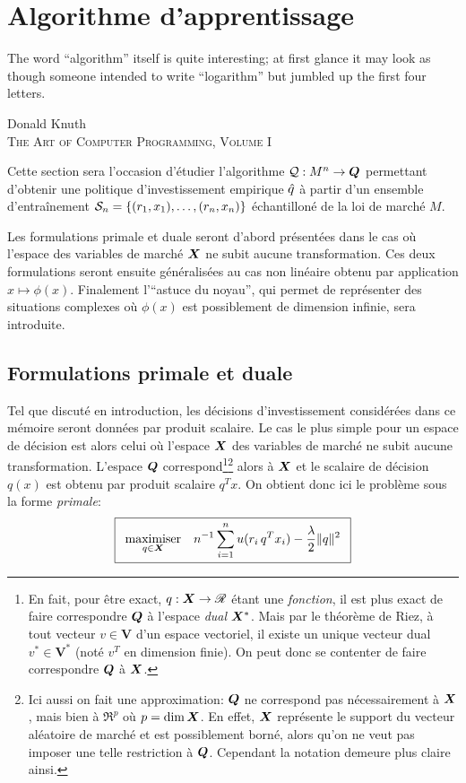 \section{Algorithme d'apprentissage}
\label{sec:kernel}

\epigraph{The word “algorithm” itself is quite interesting; at first glance it may look as
  though someone intended to write “logarithm” but jumbled up the first four
  letters.}{Donald Knuth\\\textsc{The Art of Computer Programming, Volume I}}


Cette section sera l'occasion d'étudier l'algorithme $\alg:M^n \to \Q$ permettant d'obtenir
une politique d'investissement empirique $\qh$ à partir d'un ensemble d'entraînement
$\S_n = \{(r_1,x_1),\ldots,(r_n,x_n)\}$ échantilloné de la loi de marché $M$.

Les formulations primale et duale seront d'abord présentées dans le cas où l'espace des
variables de marché $\X$ ne subit aucune transformation. Ces deux formulations seront
ensuite généralisées au cas non linéaire obtenu par application $x \mapsto \phi(x)$. Finalement
l'``astuce du noyau'', qui permet de représenter des situations complexes où $\phi(x)$ est
possiblement de dimension infinie, sera introduite. 


\subsection{Formulations primale et duale}

Tel que discuté en introduction, les décisions d'investissement considérées dans ce
mémoire seront données par produit scalaire. Le cas le plus simple pour un espace de
décision est alors celui où l'espace $\X$ des variables de marché ne subit aucune
transformation. L'espace $\Q$ correspond\footnote{En fait, pour être exact,
  $q : \X \to \Re$ étant une \textit{fonction}, il est plus exact de faire correspondre
  $\Q$ à l'espace \textit{dual} $\X^*$. Mais par le théorème de Riez, à tout vecteur
  $v \in \bm V$ d'un espace vectoriel, il existe un unique vecteur dual $v^* \in \bm V^*$
  (noté $v^T$ en dimension finie). On peut donc se contenter de faire correspondre $\Q$ à
  $\X$.}\footnote{Ici aussi on fait une approximation: $\Q$ ne correspond pas
  nécessairement à $\X$, mais bien à $\Re^p$ où $p = \dim\X$. En effet, $\X$ représente le
  support du vecteur aléatoire de marché et est possiblement borné, alors qu'on ne veut
  pas imposer une telle restriction à $\Q$. Cependant la notation demeure plus claire
  ainsi. } alors à $\X$ et le scalaire de décision $q(x)$ est obtenu par produit scalaire
$q^Tx$. On obtient donc ici le problème sous la forme \textit{primale}: {\begin{equation}
    \boxed{ \maximizeEquation[q\in\X]{n^{-1}\sumi u(r_i\,q^Tx_i) - \frac{\lambda}{2}\|q\|^2}}
\end{equation}
\vspace{-\baselineskip}}

